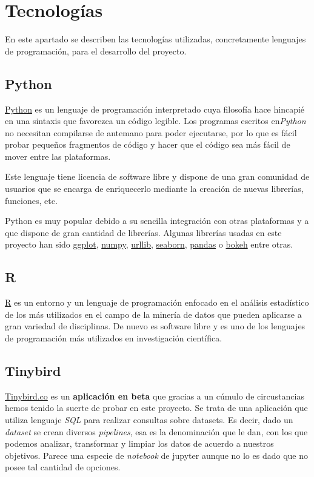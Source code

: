 \section{Tecnologías}\label{tecnologias}
 En este apartado se describen las tecnologías utilizadas, concretamente lenguajes de programación, para el desarrollo del proyecto. 
 
 \subsection{Python}\label{tecnologias_python}
 
 \href{python.org}{Python} es un lenguaje de programación interpretado cuya filosofía hace hincapié en una sintaxis que favorezca un código legible. Los programas escritos en\textit{Python} no necesitan compilarse de antemano para poder ejecutarse, por lo que es fácil probar pequeños fragmentos de código y hacer que el código sea más fácil de mover entre las plataformas.
 
 
Este lenguaje tiene licencia de software libre y dispone de una gran comunidad de usuarios que se encarga de enriquecerlo mediante la creación de nuevas librerías, funciones, etc. 

Python es muy popular debido a su sencilla integración con otras plataformas y a que dispone de gran cantidad de librerías. Algunas librerías usadas en este proyecto han sido \href{https://ggplot2.tidyverse.org/}{ggplot}, \href{https://numpy.org/}{numpy}, \href{https://numpy.org/}{urllib},
\href{https://seaborn.pydata.org/}{seaborn},
 \href{https://pandas.pydata.org/}{pandas} o \href{https://bokeh.org/}{bokeh} entre otras.

  \subsection{R}\label{tecnologias_R}
  \href{r-project.org}{R} es un entorno y un lenguaje de programación enfocado en el análisis estadístico de los más utilizados en el campo de la minería de datos que pueden aplicarse a gran variedad de disciplinas. De nuevo es software libre y es uno de los lenguajes de programación más utilizados en investigación científica.
  
 \subsection{Tinybird}
\href{https://tinybird.co//}{Tinybird.co} es un \textbf{aplicación en beta} que gracias a un cúmulo de circustancias hemos tenido la suerte de probar en este proyecto. Se trata de una aplicación que utiliza lenguaje \textit{SQL} para realizar consultas sobre datasets. Es decir, dado un \textit{dataset} se crean diversos \textit{pipelines}, esa es la denominación que le dan, con los que podemos analizar, transformar y limpiar los datos de acuerdo a nuestros objetivos. Parece una especie de \textit{notebook} de jupyter aunque no lo es dado que no posee tal cantidad de opciones. 

